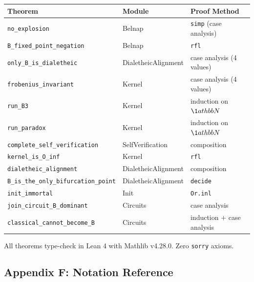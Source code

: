 \documentclass[10pt,a4paper]{article}
\begin{document}
\begin{table}[htbp]
\centering
\small
{}
\begin{tabularx}{\textwidth}{>{\centering\arraybackslash}X >{\centering\arraybackslash}X >{\centering\arraybackslash}X}
\toprule
\rowcolor{gray!25}\textbf{Theorem} & \textbf{Module} & \textbf{Proof Method} \\
\midrule
\rowcolors{1}{white}{gray!10}
\texttt{no\_\allowbreak explosion} & Belnap & \texttt{simp} (case analysis) \\
\texttt{B\_\allowbreak fixed\_\allowbreak point\_\allowbreak negation} & Belnap & \texttt{rfl} \\
\texttt{only\_\allowbreak B\_\allowbreak is\_\allowbreak dialetheic} & DialetheicAlignment & case analysis (4 values) \\
\texttt{frobenius\_\allowbreak invariant} & Kernel & case analysis (4 values) \\
\texttt{run\_\allowbreak B3} & Kernel & induction on $\\\1athbb{N}$ \\
\texttt{run\_\allowbreak paradox} & Kernel & induction on $\\\1athbb{N}$ \\
\texttt{complete\_\allowbreak self\_\allowbreak verification} & SelfVerification & composition \\
\texttt{kernel\_\allowbreak is\_\allowbreak O\_\allowbreak inf} & Kernel & \texttt{rfl} \\
\texttt{dialetheic\_\allowbreak alignment} & DialetheicAlignment & composition \\
\texttt{B\_\allowbreak is\_\allowbreak the\_\allowbreak only\_\allowbreak bifurcation\_\allowbreak point} & DialetheicAlignment & \texttt{decide} \\
\texttt{init\_\allowbreak immortal} & Init & \texttt{Or.\allowbreak inl} \\
\texttt{join\_\allowbreak circuit\_\allowbreak B\_\allowbreak dominant} & Circuits & case analysis \\
\texttt{classical\_\allowbreak cannot\_\allowbreak become\_\allowbreak B} & Circuits & induction + case analysis \\
\bottomrule
\end{tabularx}
\end{table}

All theorems type-check in Lean 4 with Mathlib v4.28.0. Zero \texttt{sorry} axioms.

\subsection{Appendix F: Notation Reference}
\end{document}
